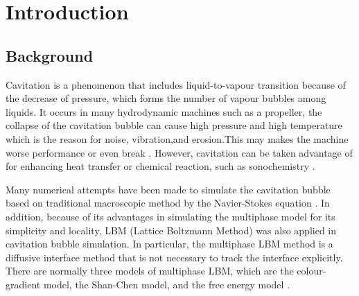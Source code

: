 \documentclass[review]{elsarticle}
\begin{document}
\linenumbers

\section{Introduction}
\subsection{Background}
Cavitation is a phenomenon that includes liquid-to-vapour transition because of the decrease of pressure, which forms the number of vapour bubbles among liquids. It occurs in many hydrodynamic machines such as a propeller, the collapse of the cavitation bubble can cause high pressure and high temperature which is the reason for noise, vibration,and erosion.This may makes the machine worse performance or even break \cite{peng2019simulation}. However, cavitation can be taken advantage of for enhancing heat transfer or chemical reaction, such as sonochemistry \cite{thompson1999sonochemistry}. 

Many numerical attempts have been made to simulate the cavitation bubble based on traditional macroscopic method by the Navier-Stokes equation \cite{ogloblina2018simulation,shang2022investigation,koch2016numerical}. In addition, because of its advantages in simulating the multiphase model for its simplicity and locality, LBM (Lattice Boltzmann Method) was also applied in cavitation bubble simulation. In particular, the multiphase LBM method is a diffusive interface method that is not necessary to track the interface explicitly. There are normally three models of multiphase LBM, which are the colour-gradient model, the Shan-Chen model, and the free energy model \cite{sudhakar2020evolution}.
\end{document}
